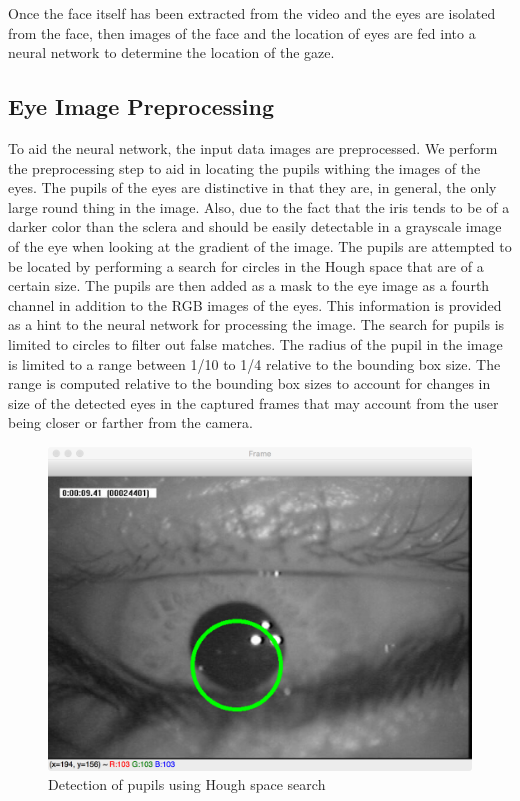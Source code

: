 \documentclass[10pt,twocolumn,letterpaper]{article}
\begin{document}
Once the face itself has been extracted from the video and the eyes
are isolated from the face, then images  of the face and the location
of eyes are fed into a neural network to determine the location of the
gaze.

\subsection{Eye Image Preprocessing}
To aid the neural network, the input data images are preprocessed. We
perform the preprocessing step to aid in locating the pupils withing
the images of the eyes. The pupils of the eyes are distinctive in that
they are, in general, the only large round thing in the image. Also,
due to the fact that the iris tends to be of a darker color than the
sclera and should be easily detectable in a grayscale image of the
eye when looking at the gradient of the image. The pupils are
attempted to be located by performing a search for circles in the
Hough space that are of a certain size. The pupils are then added as a
mask to the eye image as a fourth channel in addition to the RGB
images of the eyes. This information is provided as a hint to the
neural network for processing the image. The search for pupils is
limited to circles to filter out false matches. The radius of the pupil
in the image is limited to a range between 1/10 to 1/4 relative to the
bounding box size. The range is computed relative to the bounding box
sizes to account for changes in size of the detected eyes in the
captured frames that may account from the user being closer or farther
from the camera. 

\begin{figure}[!h]
  \begin{center}
    \includegraphics[width=\linewidth]{hough-uta-dataset.png}
    \caption{Detection of pupils using Hough space search}
    \label{fig:hough-pupils-uta}
  \end{center}
\end{figure}
\end{document}
